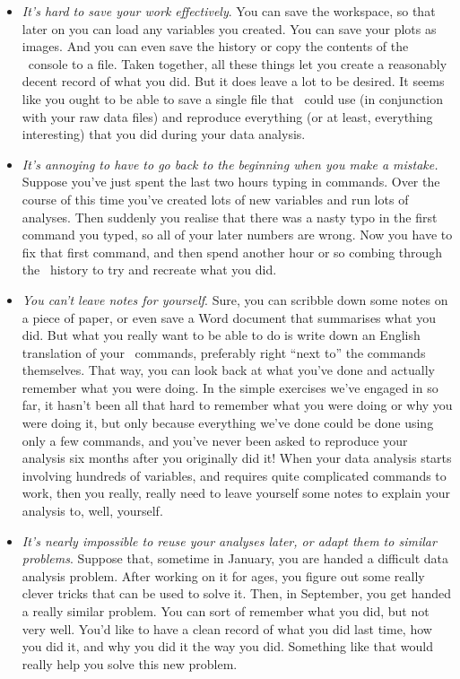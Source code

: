 \begin{itemize}
\item {\it It's hard to save your work effectively}. You can save the workspace, so that later on you can load any variables you created.  You can save your plots as images. And you can even save the history or copy the contents of the \R\ console to a file. Taken together, all these things let you create a reasonably decent record of what you did. But it does leave a lot to be desired. It seems like you ought to be able to save a single file that \R\ could use (in conjunction with your raw data files) and reproduce everything (or at least, everything interesting) that you did during your data analysis.

\item {\it It's annoying to have to go back to the beginning when you make a mistake.} Suppose you've just spent the last two hours typing in commands. Over the course of this time you've created lots of new variables and run lots of analyses. Then suddenly you realise that there was a nasty typo in the first command you typed, so all of your later numbers are wrong. Now you have to fix that first command, and then spend another hour or so combing through the \R\ history to try and recreate what you did.


\item {\it You can't leave notes for yourself}. Sure, you can scribble down some notes on a piece of paper, or even save a Word document that summarises what you did. But what you really want to be able to do is write down an English translation of your \R\ commands, preferably right ``next to'' the commands themselves. That way, you can look back at what you've done and actually remember what you were doing. In the simple exercises we've engaged in so far, it hasn't been all that hard to remember what you were doing or why you were doing it, but only because everything we've done could be done using only a few commands, and you've never been asked to reproduce your analysis six months after you originally did it! When your data analysis starts involving hundreds of variables, and requires quite complicated commands to work, then you really, really need to leave yourself some notes to explain your analysis to, well, yourself. 

\item {\it It's nearly impossible to reuse your analyses later, or adapt them to similar problems}. Suppose that, sometime in January, you are handed a difficult data analysis problem. After working on it for ages, you figure out some really clever tricks that can be used to solve it. Then, in September, you get handed a really similar problem. You can sort of remember what you did, but not very well. You'd like to have a clean record of what you did last time, how you did it, and why you did it the way you did. Something like that would really help you solve this new problem.


\end{itemize}
